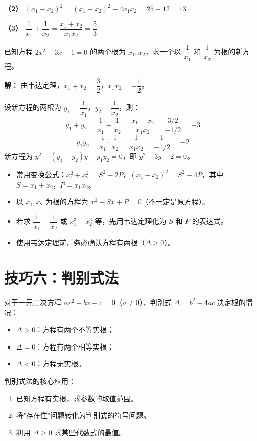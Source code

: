 \documentclass[12pt, a4paper]{ctexart}
\begin{document}
\textbf{（2）} $(x_1-x_2)^2 = (x_1+x_2)^2 - 4x_1 x_2 = 25 - 12 = \boxed{13}$

\textbf{（3）} $\dfrac{1}{x_1}+\dfrac{1}{x_2} = \dfrac{x_1+x_2}{x_1 x_2} = \dfrac{5}{3}$

\begin{examplebox}[【例11】构造新方程]
已知方程 $2x^2 - 3x - 1 = 0$ 的两个根为 $x_1, x_2$，求一个以 $\dfrac{1}{x_1}$ 和 $\dfrac{1}{x_2}$ 为根的新方程。
\end{examplebox}

\textbf{解：} 由韦达定理，$x_1+x_2 = \dfrac{3}{2}$，$x_1 x_2 = -\dfrac{1}{2}$。

设新方程的两根为 $y_1 = \dfrac{1}{x_1}$，$y_2 = \dfrac{1}{x_2}$，则：
\[
y_1 + y_2 = \frac{1}{x_1}+\frac{1}{x_2} = \frac{x_1+x_2}{x_1 x_2} = \frac{3/2}{-1/2} = -3
\]
\[
y_1 y_2 = \frac{1}{x_1}\cdot\frac{1}{x_2} = \frac{1}{x_1 x_2} = \frac{1}{-1/2} = -2
\]
新方程为 $y^2 - (y_1+y_2)y + y_1 y_2 = 0$，即 $\boxed{y^2 + 3y - 2 = 0}$。

\begin{tipbox}[韦达定理应用要点]
\begin{itemize}[leftmargin=1.5em]
  \item 常用变换公式：$x_1^2+x_2^2 = S^2-2P$，$(x_1-x_2)^2 = S^2-4P$，其中 $S=x_1+x_2$，$P=x_1 x_2$。
  \item 以 $x_1, x_2$ 为根的方程为 $x^2 - Sx + P = 0$（不一定是原方程）。
  \item 若求 $\dfrac{1}{x_1}+\dfrac{1}{x_2}$ 或 $x_1^3+x_2^3$ 等，先用韦达定理化为 $S$ 和 $P$ 的表达式。
  \item 使用韦达定理前，务必确认方程有两根（$\Delta \geqslant 0$）。
\end{itemize}
\end{tipbox}

\section*{\textcolor{mainblue}{技巧六：判别式法}}

\begin{knowledgebox}[判别式法的核心思想]
对于一元二次方程 $ax^2+bx+c=0$（$a\neq 0$），判别式 $\Delta = b^2 - 4ac$ 决定根的情况：
\begin{itemize}[leftmargin=1.5em]
  \item $\Delta > 0$：方程有两个不等实根；
  \item $\Delta = 0$：方程有两个相等实根；
  \item $\Delta < 0$：方程无实根。
\end{itemize}
判别式法的核心应用：
\begin{enumerate}[leftmargin=2em]
  \item 已知方程有实根，求参数的取值范围。
  \item 将"存在性"问题转化为判别式的符号问题。
  \item 利用 $\Delta \geqslant 0$ 求某些代数式的最值。
\end{enumerate}
\end{knowledgebox}
\end{document}
